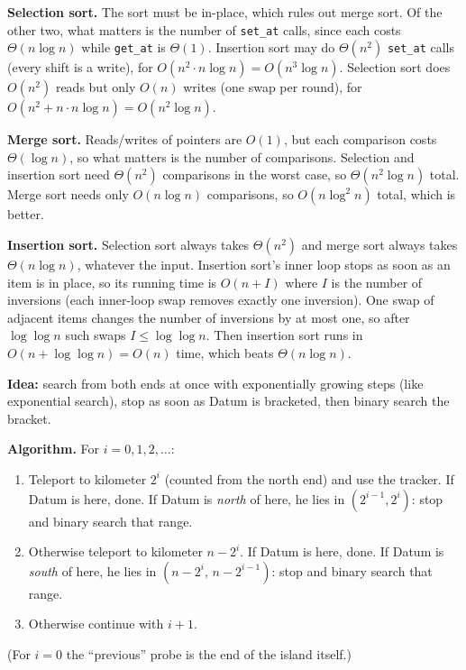 \documentclass[12pt,twoside]{article}
\begin{document}
\begin{problems}
\newpage
\problem  %

\begin{problemparts}
\problempart %
\textbf{Selection sort.} The sort must be in-place, which rules out merge sort. Of the other two,
what matters is the number of \texttt{set\_at} calls, since each costs $\Theta(n\log n)$ while
\texttt{get\_at} is $\Theta(1)$. Insertion sort may do $\Theta(n^2)$ \texttt{set\_at} calls (every
shift is a write), for $O(n^2\cdot n\log n)=O(n^3\log n)$. Selection sort does $O(n^2)$ reads but
only $O(n)$ writes (one swap per round), for $O(n^2 + n\cdot n\log n)=O(n^2\log n)$.

\problempart %
\textbf{Merge sort.} Reads/writes of pointers are $O(1)$, but each comparison costs $\Theta(\log n)$,
so what matters is the number of comparisons. Selection and insertion sort need $\Theta(n^2)$
comparisons in the worst case, so $\Theta(n^2\log n)$ total. Merge sort needs only $O(n\log n)$
comparisons, so $O(n\log^2 n)$ total, which is better.

\problempart %
\textbf{Insertion sort.} Selection sort always takes $\Theta(n^2)$ and merge sort always takes
$\Theta(n\log n)$, whatever the input. Insertion sort's inner loop stops as soon as an item is in
place, so its running time is $O(n + I)$ where $I$ is the number of inversions (each inner-loop
swap removes exactly one inversion). One swap of adjacent items changes the number of inversions
by at most one, so after $\log\log n$ such swaps $I\le \log\log n$. Then insertion sort runs in
$O(n+\log\log n)=O(n)$ time, which beats $\Theta(n\log n)$.
\end{problemparts}

\newpage
\problem  %

\textbf{Idea:} search from both ends at once with exponentially growing steps (like exponential
search), stop as soon as Datum is bracketed, then binary search the bracket.

\textbf{Algorithm.} For $i=0,1,2,\dots$:
\begin{enumerate}
\item Teleport to kilometer $2^i$ (counted from the north end) and use the tracker. If Datum is
here, done. If Datum is \emph{north} of here, he lies in $(2^{i-1},2^i)$: stop and binary search
that range.
\item Otherwise teleport to kilometer $n-2^i$. If Datum is here, done. If Datum is \emph{south}
of here, he lies in $(n-2^i,\,n-2^{i-1})$: stop and binary search that range.
\item Otherwise continue with $i+1$.
\end{enumerate}
(For $i=0$ the ``previous'' probe is the end of the island itself.)


\end{problems}
\end{document}
